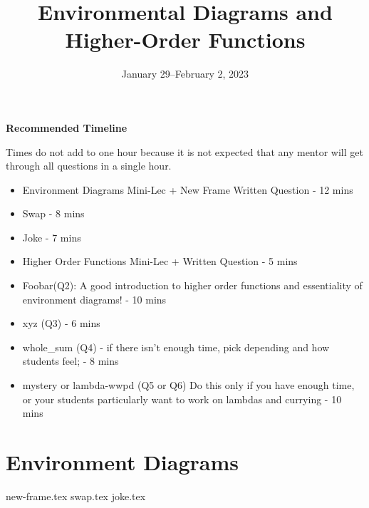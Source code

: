 \documentclass{exam}
\title{Environmental Diagrams \titlebreak and Higher-Order Functions}
\date{January 29--February 2, 2023}
\begin{document}
\maketitle

\begin{blocksection}
\begin{guide}
\textbf{Recommended Timeline}

Times do not add to one hour because it is not expected that any mentor will get through all questions in a single hour. 

\begin{itemize}
    \item Environment Diagrams Mini-Lec + New Frame Written Question - 12 mins
    \item Swap - 8 mins
    \item Joke - 7 mins
    \item Higher Order Functions Mini-Lec + Written Question - 5 mins
    \item Foobar(Q2): A good introduction to higher order functions and essentiality of environment diagrams! - 10 mins
    \item xyz (Q3) - 6 mins
    \item whole\_sum (Q4) - if there isn't enough time, pick depending and how students feel; - 8 mins
    \item mystery or lambda-wwpd (Q5 or Q6) Do this only if you have enough time, or your students particularly want to work on lambdas and currying - 10 mins
\end{itemize}
\end{guide}
\end{blocksection}


\section{Environment Diagrams}

\begin{questions}
{new-frame.tex}
{swap.tex}
{joke.tex}
\end{questions}
\end{document}
